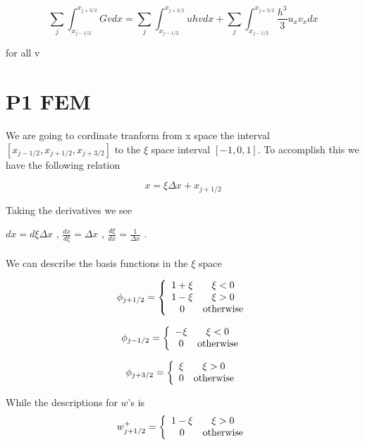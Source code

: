 \documentclass[12pt]{article}
\begin{document}
\[\sum_{j}\int_{x_{j-1/2}}^{x_{j+3/2}} Gv dx = \sum_{j}\int_{x_{j-1/2}}^{x_{j+3/2}}  uhv dx + \sum_{j}\int_{x_{j-1/2}}^{x_{j+3/2}} \frac{h^3}{3}u_{x}v_{x}dx\]

for all v

\section{P1 FEM}
We are going to cordinate tranform from x space the interval $[x_{j-1/2},x_{j+1/2} ,x_{j+3/2}]$ to the $\xi$ space interval $[-1,0,1]$. To accomplish this we have the following relation

$$x = \xi\Delta x + x_{j+1/2}$$

Taking the derivatives we see


$dx = d\xi\Delta x$ , $\frac{dx}{d\xi} = \Delta x$ , $\frac{d\xi}{dx} = \frac{1}{\Delta x}$ . \\ \\ We can describe the basis functions in the $\xi$ space

\begin{equation}
\phi_{j+1/2} = \left\lbrace \begin{array}{c c}
1 + \xi & \xi < 0 \\
1 - \xi & \xi > 0\\
0 & \text{otherwise}
\end{array} 
\right.
\end{equation}

\begin{equation}
\phi_{j-1/2} = \left\lbrace \begin{array}{c c}
-\xi & \xi < 0 \\
0 & \text{otherwise}
\end{array} 
\right.
\end{equation}

\begin{equation}
\phi_{j+3/2} = \left\lbrace \begin{array}{c c}
\xi & \xi > 0 \\
0 & \text{otherwise}
\end{array} 
\right.
\end{equation}

While the descriptions for $w$'s is
\begin{equation}
w^+_{j+1/2} = \left\lbrace \begin{array}{c c}
1-\xi & \xi > 0 \\
0 & \text{otherwise}
\end{array} 
\right.
\end{equation}
\end{document}
